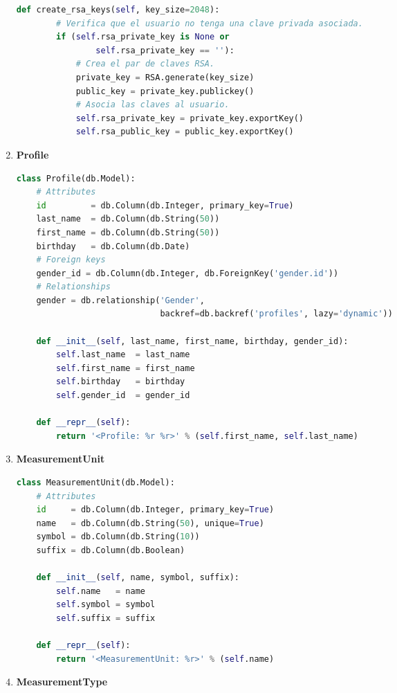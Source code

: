 \documentclass[a4paper,12pt]{article}
\begin{document}
\begin{enumerate}
\begin{lstlisting}[language=Python]
    def create_rsa_keys(self, key_size=2048):
        # Verifica que el usuario no tenga una clave privada asociada.
        if (self.rsa_private_key is None or
                self.rsa_private_key == ''):
            # Crea el par de claves RSA.
            private_key = RSA.generate(key_size)
            public_key = private_key.publickey()
            # Asocia las claves al usuario.
            self.rsa_private_key = private_key.exportKey()
            self.rsa_public_key = public_key.exportKey()
\end{lstlisting}
	
	\item \textbf{Profile}
	
\begin{lstlisting}[language=Python]
class Profile(db.Model):
    # Attributes
    id         = db.Column(db.Integer, primary_key=True)
    last_name  = db.Column(db.String(50))
    first_name = db.Column(db.String(50))
    birthday   = db.Column(db.Date)
    # Foreign keys
    gender_id = db.Column(db.Integer, db.ForeignKey('gender.id'))
    # Relationships
    gender = db.relationship('Gender',
                             backref=db.backref('profiles', lazy='dynamic'))

    def __init__(self, last_name, first_name, birthday, gender_id):
        self.last_name  = last_name
        self.first_name = first_name
        self.birthday   = birthday
        self.gender_id  = gender_id

    def __repr__(self):
        return '<Profile: %r %r>' % (self.first_name, self.last_name)
\end{lstlisting}
	
\item \textbf{MeasurementUnit}
	
\begin{lstlisting}[language=Python]
class MeasurementUnit(db.Model):
    # Attributes
    id     = db.Column(db.Integer, primary_key=True)
    name   = db.Column(db.String(50), unique=True)
    symbol = db.Column(db.String(10))
    suffix = db.Column(db.Boolean)

    def __init__(self, name, symbol, suffix):
        self.name   = name
        self.symbol = symbol
        self.suffix = suffix

    def __repr__(self):
        return '<MeasurementUnit: %r>' % (self.name)
\end{lstlisting}
	
\item \textbf{MeasurementType}
	

\end{enumerate}
\end{document}
